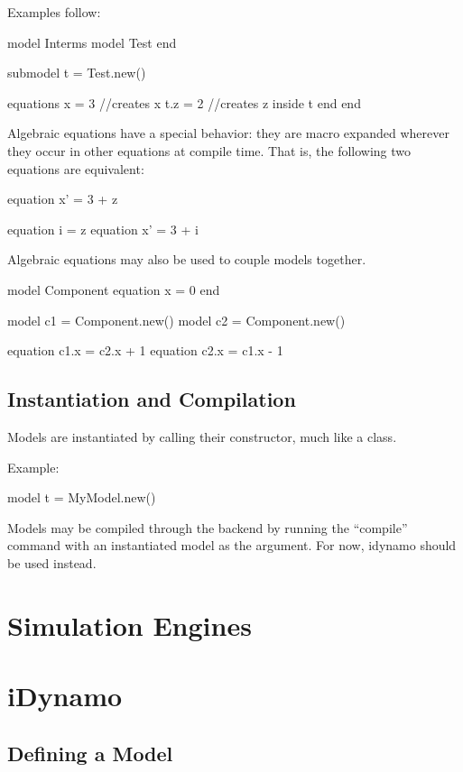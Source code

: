 \documentclass[11pt]{article}
\begin{document}
Examples follow:

\begin{dsl}
model Interms
  model Test
  end
  
  submodel t = Test.new()

  equations
    x = 3 //creates x
    t.z = 2 //creates z inside t
  end
end
\end{dsl}

Algebraic equations have a special behavior: they are macro expanded wherever they occur in other equations at compile time.  That is, the following two equations are equivalent:

\begin{dsl}
equation x' = 3 + z

equation i = z
equation x' = 3 + i
\end{dsl}

Algebraic equations may also be used to couple models together.

\begin{dsl}
model Component
  equation x = 0
end

model c1 = Component.new()
model c2 = Component.new()

equation c1.x = c2.x + 1
equation c2.x = c1.x - 1
\end{dsl}

\subsection{Instantiation and Compilation}

Models are instantiated by calling their constructor, much like a class.

Example:

\begin{dsl}
  model t = MyModel.new()
\end{dsl}

Models may be compiled through the backend by running the ``compile''
command with an instantiated model as the argument.  For now, idynamo
should be used instead.

\newpage
\section{Simulation Engines}

\newpage
\section{iDynamo}
\subsection{Defining a Model}
\end{document}

